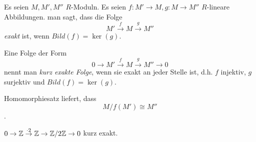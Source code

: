 \documentclass[../main.tex]{subfiles}
\begin{document}
\begin{definition}
    Es seien $M,M',M''$ $R$-Moduln.
    Es seien $f:M'\rightarrow M, g:M\rightarrow M''$ $R$-lineare Abbildungen.
    man sagt, dass die Folge $$M'\overset{f}{\rightarrow} M \overset{g}{\rightarrow} M''$$
    \emph{exakt} ist, wenn $Bild(f) = \ker(g)$.

    Eine Folge der Form $$0\rightarrow M'\overset{f}{\rightarrow} M \overset{g}{\rightarrow} M'' \rightarrow 0$$ nennt man \emph{kurz exakte Folge}, wenn sie exakt an jeder Stelle ist, d.h. $f$ injektiv, $g$ surjektiv und $Bild(f) = \ker(g)$.

    Homomorphiesatz liefert, dass
    $$M/f(M') \cong M''$$.
\end{definition}
\begin{example*}
    $0\rightarrow \mathbb{Z}\overset{\cdot 2}{\rightarrow} \mathbb{Z} \rightarrow \mathbb{Z}/2\mathbb{Z} \rightarrow 0$ kurz exakt.
\end{example*}
\end{document}
